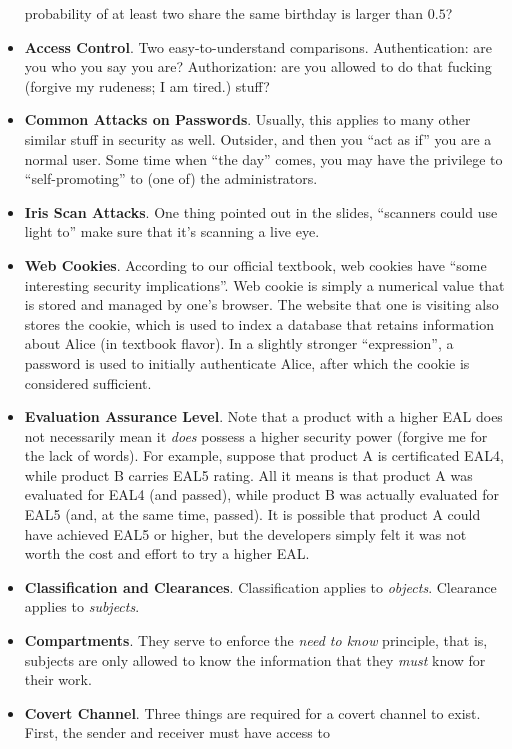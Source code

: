 \documentclass[twocolumn]{article}
\begin{document}
\begin{itemize}
  probability of at least two share the same birthday is larger than
  $0.5$?  
\item \textbf{Access Control}. Two easy-to-understand
  comparisons. Authentication: are you who you say you are?
  Authorization: are you allowed to do that fucking (forgive my
  rudeness; I am tired.) stuff?
\item \textbf{Common Attacks on Passwords}. Usually, this applies to
  many other similar stuff in security as well. Outsider, and then you
  ``act as if'' you are a normal user. Some time when ``the day''
  comes, you may have the privilege to ``self-promoting'' to (one of)
  the administrators.
\item \textbf{Iris Scan Attacks}. One thing pointed out in the slides,
  ``scanners could use light to'' make sure that it's scanning a live
  eye. 
\item \textbf{Web Cookies}. According to our official textbook, web
  cookies have ``some interesting security implications''. Web cookie
  is simply a numerical value that is stored and managed by one's
  browser. The website that one is visiting also stores the cookie,
  which is used to index a database that retains information about
  Alice (in textbook flavor). In a slightly stronger ``expression'', a
  password is used to initially authenticate Alice, after which the
  cookie is considered sufficient.
\item \textbf{Evaluation Assurance Level}. Note that a product with a
  higher EAL does not necessarily mean it \emph{does} possess a higher
  security power (forgive me for the lack of words). For example,
  suppose that product A is certificated EAL4, while product B carries
  EAL5 rating. All it means is that product A was evaluated for EAL4
  (and passed), while product B was actually evaluated for EAL5 (and,
  at the same time, passed). It is possible that product A could have
  achieved EAL5 or higher, but the developers simply felt it was not
  worth the cost and effort to try a higher EAL.\@
\item \textbf{Classification and Clearances}. Classification applies
  to \emph{objects}. Clearance applies to \emph{subjects}. 
\item \textbf{Compartments}. They serve to enforce the \emph{need to
    know} principle, that is, subjects are only allowed to know the
  information that they \emph{must} know for their work.
\item \textbf{Covert Channel}. Three things are required for a covert
  channel to exist. First, the sender and receiver must have access to

\end{itemize}
\end{document}
